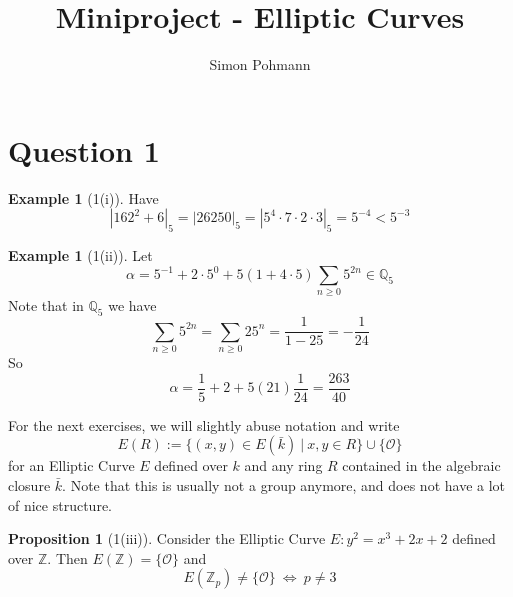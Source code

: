 \documentclass{scrartcl}
\title{Miniproject - Elliptic Curves}
\author{Simon Pohmann}
\newcommand{\Z}{\mathbb{Z}}
\newcommand{\Q}{\mathbb{Q}}
\renewcommand{\O}{\mathcal{O}}
\theoremstyle{definition}
\newtheorem{prop}[subsection]{Proposition}
\newtheorem{example}[subsection]{Example}
\begin{document}
\maketitle
\listoftheorems

\section{Question 1}

\begin{example}[1(i)]
    Have
    \begin{equation*}
        |162^2 + 6|_5 = |26250|_5 = |5^4 \cdot 7 \cdot 2 \cdot 3|_5 = 5^{-4} < 5^{-3}
    \end{equation*}
\end{example}

\begin{example}[1(ii)]
    Let
    \begin{equation*}
        \alpha = 5^{-1} + 2 \cdot 5^0 + 5 (1 + 4 \cdot 5) \sum_{n \geq 0} 5^{2n} \in \Q_5
    \end{equation*}
    Note that in $\Q_5$ we have
    \begin{equation*}
        \sum_{n \geq 0} 5^{2n} = \sum_{n \geq 0} 25^n = \frac 1 {1 - 25} = -\frac 1 {24}
    \end{equation*}
    So
    \begin{equation*}
        \alpha = \frac 1 5 + 2 + 5 (21) \frac 1 {24} = \frac {263} {40}
    \end{equation*}
\end{example}
For the next exercises, we will slightly abuse notation and write
\begin{equation*}
    E(R) := \{ (x, y) \in E(\bar{k}) \ | \ x, y \in R \} \cup \{\O\}
\end{equation*}
for an Elliptic Curve $E$ defined over $k$ and any ring $R$ contained in the algebraic closure $\bar{k}$.
Note that this is usually not a group anymore, and does not have a lot of nice structure.
\begin{prop}[1(iii)]
    Consider the Elliptic Curve $E: y^2 = x^3 + 2x + 2$ defined over $\Z$.
    Then $E(\Z) = \{ \O \}$ and
    \begin{equation*}
        E(\Z_p) \neq \{ \O \} \ \Leftrightarrow \ p \neq 3
    \end{equation*}
\end{prop}
\end{document}
